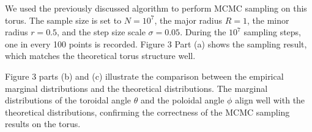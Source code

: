 \documentclass{article}
\begin{document}
We used the previously discussed algorithm to perform MCMC sampling on this torus. The sample size is set to \(N = 10^7\), the major radius \(R = 1\), the minor radius \(r = 0.5\), and the step size scale \(\sigma = 0.05\). During the \(10^7\) sampling steps, one in every 100 points is recorded. Figure 3 Part (a) shows the sampling result, which matches the theoretical torus structure well.




        
    


Figure 3 parts (b) and (c) illustrate the comparison between the empirical marginal distributions and the theoretical distributions. The marginal distributions of the toroidal angle \(\theta\) and the poloidal angle \(\phi\) align well with the theoretical distributions, confirming the correctness of the MCMC sampling results on the torus.


    
\end{document}

